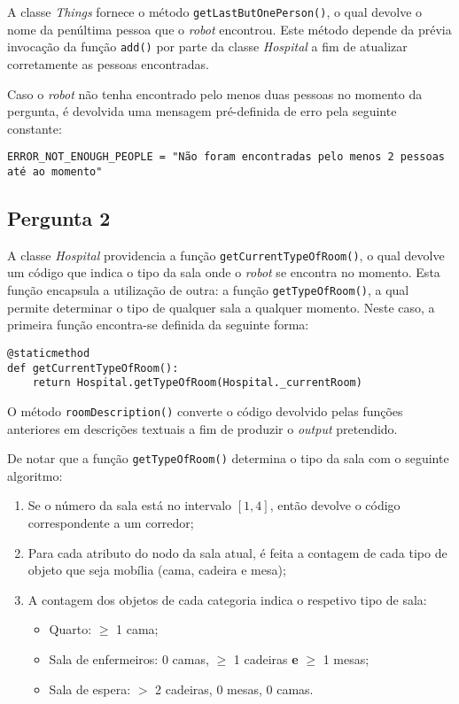 
A classe \textit{Things} fornece o método \texttt{getLastButOnePerson()}, o qual devolve o nome da penúltima pessoa que o \textit{robot} encontrou. Este método depende da prévia invocação da função \texttt{add()} por parte da classe \textit{Hospital} a fim de atualizar corretamente as pessoas encontradas.

Caso o \textit{robot} não tenha encontrado pelo menos duas pessoas no momento da pergunta, é devolvida uma mensagem pré-definida de erro pela seguinte constante:

\texttt{ERROR_NOT_ENOUGH_PEOPLE = "Não foram encontradas pelo menos 2 pessoas até ao momento"}


\subsection{Pergunta 2}
\label{ssec::implement:details:perg2}


A classe \textit{Hospital} providencia a função \texttt{getCurrentTypeOfRoom()}, o qual devolve um código que indica o tipo da sala onde o \textit{robot} se encontra no momento. Esta função encapsula a utilização de outra: a função \texttt{getTypeOfRoom()}, a qual permite determinar o tipo de qualquer sala a qualquer momento. Neste caso, a primeira função encontra-se definida da seguinte forma:

\begin{verbatim}
@staticmethod
def getCurrentTypeOfRoom():
    return Hospital.getTypeOfRoom(Hospital._currentRoom)
\end{verbatim}

O método \texttt{roomDescription()} converte o código devolvido pelas funções anteriores em descrições textuais a fim de produzir o \textit{output} pretendido.

De notar que a função \texttt{getTypeOfRoom()} determina o tipo da sala com o seguinte algoritmo:

\begin{enumerate}
    \item Se o número da sala está no intervalo $[1, 4]$, então devolve o código correspondente a um corredor;
    \item Para cada atributo do nodo da sala atual, é feita a contagem de cada tipo de objeto que seja mobília (cama, cadeira e mesa);
    \item A contagem dos objetos de cada categoria indica o respetivo tipo de sala:
    \begin{itemize}
        \item Quarto: $\geq$ 1 cama;
        \item Sala de enfermeiros: 0 camas, $\geq$ 1 cadeiras \textbf{e} $\geq$ 1 mesas;
        \item Sala de espera: $>$ 2 cadeiras, 0 mesas, 0 camas.
    \end{itemize}
\end{enumerate}


